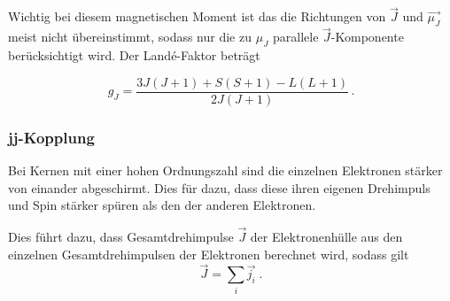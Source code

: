 \noindent
Wichtig bei diesem magnetischen Moment ist das die Richtungen von $\vec{J}$ und $\vec{\mu_J}$ meist nicht übereinstimmt, sodass
nur die zu $\mu_J$ parallele $\vec{J}$-Komponente berücksichtigt wird. Der Landé-Faktor beträgt 

\begin{equation}
    g_J = \frac{3J(J+1) + S(S+1) - L(L+1)}{2J(J+1)}\, .
    \label{eqn:lande}
\end{equation}


\subsubsection{jj-Kopplung}

Bei Kernen mit einer hohen Ordnungszahl sind die einzelnen Elektronen stärker von einander abgeschirmt. Dies für dazu, dass diese ihren eigenen Drehimpuls und Spin stärker 
spüren als den der anderen Elektronen. 

\noindent
Dies führt dazu, dass Gesamtdrehimpulse $\vec{J}$ der Elektronenhülle aus den einzelnen Gesamtdrehimpulsen der Elektronen berechnet wird, sodass gilt
\begin{equation}
    \vec{J} = \sum_i \vec{j_i} \; .
\end{equation}


